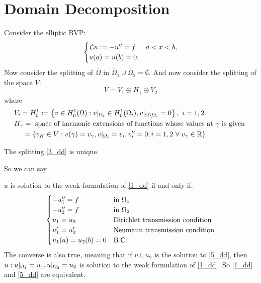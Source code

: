 \newpage
\section{Domain Decomposition}
Consider the elliptic BVP: 
\begin{equation}
    \begin{cases}
        \mathcal{L} u := -u'' = f & a < x < b, \\
        u(a) = u(b) = 0.
    \end{cases}
    \label{1_dd}
\end{equation}
Now consider the splitting of \(\overline{\Omega}\) in \(\overline{\Omega}_1 \cup \overline{\Omega}_2 = \emptyset\). And now consider the splitting of the space \(V\): 
\begin{equation}
    V = V_1 \oplus H_\gamma \oplus V_2
    \label{3_dd}
\end{equation}
where  
\begin{equation*}
    \begin{aligned}
        &V_i = \tilde{H}^1_0 := \left\{ v \in H^1_0(\Omega): v\vert_{\Omega_i} \in H^1_0(\Omega_i), v\vert_{\Omega\setminus\Omega_i} = 0 \right\}, \ i = 1,2 \\
        &H_\gamma = \text{ space of harmonic extensions of functions whose values at } \gamma \text{ is given }\\
        &\quad \;  = \left\{ v_H \in V : v(\gamma) = v_\gamma, v\vert_{\Omega_i} = v_i, v''_i = 0, i = 1,2 \ \forall \; v_\gamma \in \mathbb{R} \right\}
    \end{aligned}
\end{equation*}
\begin{remark}
    The splitting \eqref{3_dd} is unique. 
\end{remark}
So we can say
\begin{proposition}
    \(u\) is solution to the weak formulation of \eqref{1_dd} if and only if:
    \begin{equation}
        \begin{cases}
            -u''_1 = f & \text{in }\Omega_1 \\
            -u''_2 = f & \text{in }\Omega_2 \\
            u_1 = u_2 & \text{Dirichlet transmission condition} \\
            u'_1 = u'_2 & \text{Neumann transmission condition} \\
            u_1(a) = u_2(b) = 0 & \text{B.C.}
        \end{cases}
        \label{5_dd}
    \end{equation}
    The converse is also true, meaning that if \(u1,u_2\) is the solution to \eqref{5_dd}, then \(u : u\vert_{\Omega_1} = u_1, u\vert_{\Omega_2} = u_2\) is solution to the weak formulation of \eqref{1_dd}. So \eqref{1_dd} and \eqref{5_dd} are equivalent.
\end{proposition}

